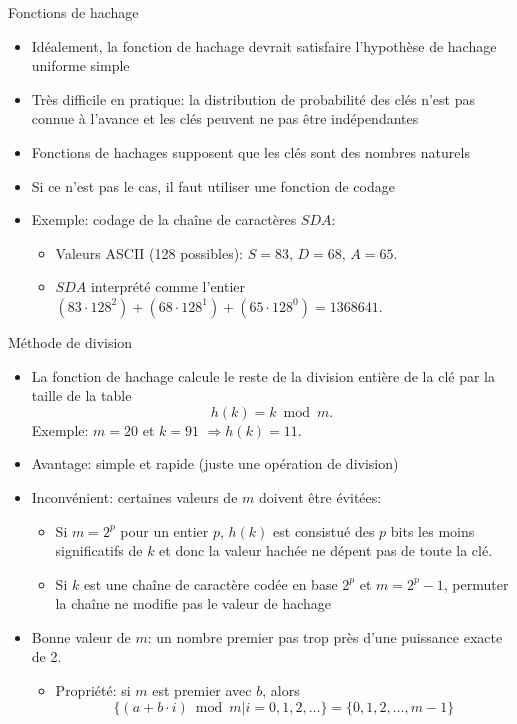 \begin{frame}{Fonctions de hachage}
\begin{itemize}
\item Idéalement, la fonction de hachage devrait satisfaire l'hypothèse de hachage uniforme simple
\item Très difficile en pratique: la distribution de probabilité des clés n'est pas connue à l'avance et les clés peuvent ne pas être indépendantes

\bigskip

\item Fonctions de hachages supposent que les clés sont des nombres naturels
\item Si ce n'est pas le cas, il faut utiliser une fonction de codage
\item Exemple: codage de la chaîne de caractères $SDA$:
\begin{itemize}
\item Valeurs ASCII (128 possibles): $S=83$, $D=68$, $A=65$.
\item $SDA$ interprété comme l'entier $(83\cdot 128^2)+(68\cdot 128^1)+(65\cdot 128^0)=1368641$.
\end{itemize}
\end{itemize}
\end{frame}

\begin{frame}{Méthode de division}
\begin{itemize}
\item La fonction de hachage calcule le reste de la division entière de la clé par la taille de la table
$$h(k)=k\bmod m.$$
Exemple: $m=20$ et $k=91$ $\Rightarrow h(k)=11$.
\item Avantage: simple et rapide (juste une opération de division)
\item Inconvénient: certaines valeurs de $m$ doivent être évitées:
\begin{itemize}
\item Si $m=2^p$ pour un entier $p$, $h(k)$ est consistué des $p$ bits
  les moins significatifs de $k$ et donc la valeur hachée ne dépent
  pas de toute la clé.
\item Si $k$ est une chaîne de caractère codée en base $2^p$ et $m=2^p-1$, permuter la chaîne ne modifie pas le valeur de hachage
\end{itemize}
\item Bonne valeur de $m$: un nombre premier pas trop près d'une puissance exacte de 2.
\begin{itemize}
\item Propriété: si $m$ est premier avec $b$, alors
$$\{(a+b\cdot i) \bmod m|i=0,1,2,\ldots\}=\{0,1,2,\ldots,m-1\}$$
\end{itemize}
\end{itemize}
\end{frame}

